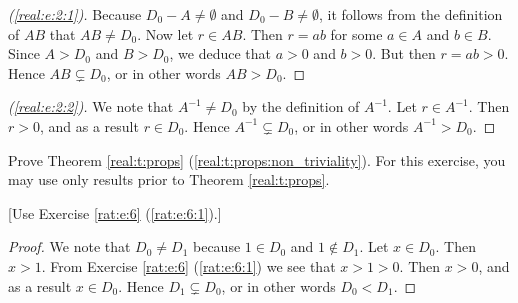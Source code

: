 \begin{proof}[(\ref{real:e:2:1})]
	Because $D_0 - A \neq \emptyset$ and $D_0 - B \neq \emptyset$, it follows from the definition of $A B$ that $A B \neq D_0$. Now let $r \in A B$. Then $r = a b$ for some $a \in A$ and $b \in B$. Since $A > D_0$ and $B > D_0$, we deduce that $a > 0$ and $b > 0$. But then $r = a b > 0$. Hence $A B \subsetneq D_0$, or in other words $A B > D_0$.
\end{proof}

\begin{proof}[(\ref{real:e:2:2})]
	We note that $A^{-1} \neq D_0$ by the definition of $A^{-1}$. Let $r \in A^{-1}$. Then $r > 0$, and as a result $r \in D_0$. Hence $A^{-1} \subsetneq D_0$, or in other words $A^{-1} > D_0$.
\end{proof}


\Newpage
\begin{exercise} %
	\label{real:e:3}
	Prove Theorem \ref{real:t:props} (\ref{real:t:props:non_triviality}). For this exercise, you may use only results prior to Theorem \ref{real:t:props}.

	\hfill [Use Exercise \ref{rat:e:6} (\ref{rat:e:6:1}).]
\end{exercise}

\begin{proof}
	We note that $D_0 \neq D_1$ because $1 \in D_0$ and $1 \notin D_1$. Let $x \in D_0$. Then $x > 1$. From Exercise \ref{rat:e:6} (\ref{rat:e:6:1}) we see that $x > 1 > 0$. Then $x > 0$, and as a result $x \in D_0$. Hence $D_1 \subsetneq D_0$, or in other words $D_0 < D_1$.
\end{proof}


